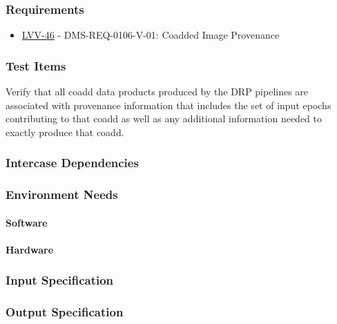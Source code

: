 \subsubsection{Requirements}
\begin{itemize}
\item \href{https://jira.lsstcorp.org/browse/LVV-46}{LVV-46} - DMS-REQ-0106-V-01: Coadded Image Provenance
\end{itemize}

\subsubsection{Test Items}
Verify that all coadd data products produced by the DRP pipelines are
associated with provenance information that includes the set of input
epochs contributing to that coadd as well as any additional information
needed to exactly produce that coadd.



\subsubsection{Intercase Dependencies}

\subsubsection{Environment Needs}

\paragraph{Software}

\paragraph{Hardware}

\subsubsection{Input Specification}

\subsubsection{Output Specification}

